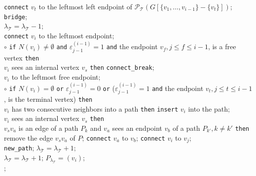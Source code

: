 \documentclass[10pt]{article}
\begin{document}
{\phantom{\tt el}\phantom{\tt el}\phantom{\tt el}\phantom{\tt
el}\phantom{\tt el}\phantom{\tt el} {\tt connect} $v_t$ to the
leftmost left endpoint of $\mathcal{P_{\mathcal{T}}}(G[\{v_1,
\ldots,
v_{i-1}\}-\{v_t\}])$; {\tt bridge}; \\
\phantom{\tt el}\phantom{\tt el}\phantom{\tt el}\phantom{\tt
el}\phantom{\tt el}\phantom{\tt el} $\lambda_\mathcal{T}=\lambda_\mathcal{T}-1$;\\
\phantom{\tt el}\phantom{\tt el}\phantom{\tt el}\phantom{\tt
el}{\tt else} {\tt connect} $v_i$ to the leftmost endpoint;\\
\phantom{\tt el}$\circ$ {\tt if} $N(v_i) \neq \emptyset$ {\tt and}
$\varepsilon^{(i-1)}_{j-1} =1$ {\tt and}
the endpoint $v_f, j \leq f \leq i-1$, is a free vertex {\tt then}\\
\phantom{\tt el}\phantom{\tt el}\phantom{\tt el}{\tt if} $v_i$ sees an internal vertex $v_s$ {\tt then} {\tt connect\_break};\\
\phantom{\tt el}\phantom{\tt el}\phantom{\tt el}{\tt else connect} $v_i$ to the leftmost free endpoint;\\
\phantom{\tt el}$\circ$ {\tt if} $N(v_i)=\emptyset$ {\tt or}
$\varepsilon^{(i-1)}_{j-1} =0$ {\tt or}
($\varepsilon^{(i-1)}_{j-1} =1$ {\tt and}
the endpoint $v_t, j \leq t \leq i-1$, is the terminal vertex) {\tt then}\\
\phantom{\tt el}\phantom{\tt el}\phantom{\tt el}{\tt if} $v_i$ has
two consecutive neighbors into a path {\tt then} {\tt insert} $v_i$ into the path;\\
\phantom{\tt el}\phantom{\tt el}\phantom{\tt el}{\tt else-if}
$v_i$ sees an internal vertex $v_s$ {\tt then}\\
\phantom{\tt el}\phantom{\tt el}\phantom{\tt el}\phantom{\tt
el}{\tt if} $v_sv_a$ is an edge of a path $P_k$ and $v_a$ sees an endpoint $v_b$ of a path $P_{k'}, k \neq k'$ {\tt then} \\
\phantom{\tt el}\phantom{\tt el}\phantom{\tt el}\phantom{\tt
el}\phantom{\tt
el} remove the edge $v_sv_a$ of $P$; {\tt connect} $v_a$ to $v_b$; {\tt connect} $v_i$ to $v_j$;\\
\phantom{\tt el}\phantom{\tt el}\phantom{\tt el}\phantom{\tt
el}{\tt else} {\tt new\_path}; $\lambda_\mathcal{T}=\lambda_\mathcal{T}+1$;\\
\phantom{\tt el}\phantom{\tt el}\phantom{\tt el}{\tt else}
$\lambda_\mathcal{T}=\lambda_\mathcal{T}+1$;
$P_{\lambda_\mathcal{T}}=(v_i)$;\\
\phantom{\tt el}{\tt endif};\\
}
\end{document}
